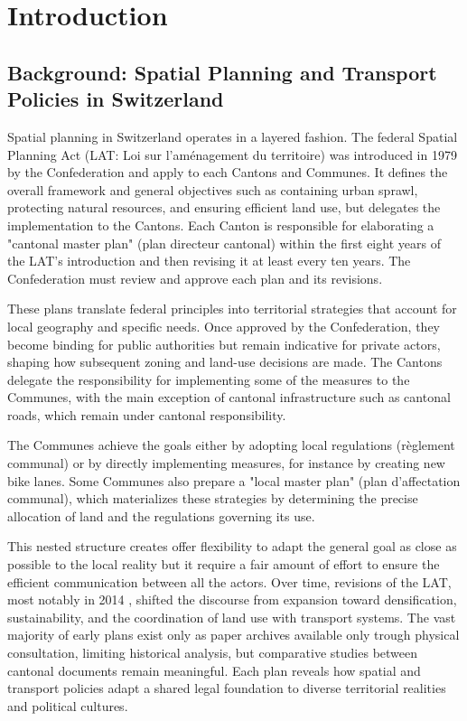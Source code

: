 \section{Introduction}

\subsection{Background: Spatial Planning and Transport Policies in Switzerland}
Spatial planning in Switzerland operates in a layered fashion.
The federal Spatial Planning Act (LAT: Loi sur l'aménagement du territoire) \cite{noauthor_rs_nodate} was introduced in 1979 by the Confederation and apply to each Cantons and Communes.
It defines the overall framework and general objectives such as containing urban sprawl, protecting natural resources, and ensuring efficient land use, but delegates the implementation to the Cantons. Each Canton is responsible for elaborating a "cantonal master plan" (plan directeur cantonal) within the first eight years of the LAT’s introduction and then revising it at least every ten years. The Confederation must review and approve each plan and its revisions.  

These plans translate federal principles into territorial strategies that account for local geography and specific needs. Once approved by the Confederation, they become binding for public authorities but remain indicative for private actors, shaping how subsequent zoning and land-use decisions are made. The Cantons delegate the responsibility for implementing some of the measures to the Communes, with the main exception of cantonal infrastructure such as cantonal roads, which remain under cantonal responsibility.  

The Communes achieve the goals either by adopting local regulations (règlement communal) or by directly implementing measures, for instance by creating new bike lanes. Some Communes also prepare a "local master plan" (plan d’affectation communal), which materializes these strategies by determining the precise allocation of land and the regulations governing its use.  

This nested structure creates offer flexibility to adapt the general goal as close as possible to the local reality but it require a fair amount of effort to ensure the efficient communication between all the actors. Over time, revisions of the LAT, most notably in 2014 \cite{ssemblee_federale_de_la_confederation_suisse_ro_2014}, shifted the discourse from expansion toward densification, sustainability, and the coordination of land use with transport systems. The vast majority of early plans exist only as paper archives available only trough physical consultation, limiting historical analysis, but comparative studies between cantonal documents remain meaningful. Each plan reveals how spatial and transport policies adapt a shared legal foundation to diverse territorial realities and political cultures.

